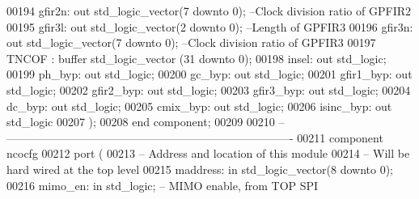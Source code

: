 \begin{DoxyCode}
00194         gfir2n: \textcolor{keywordflow}{out} \textcolor{comment}{std\_logic\_vector}(\textcolor{vhdllogic}{}\textcolor{vhdllogic}{7} \textcolor{keywordflow}{downto} \textcolor{vhdllogic}{}\textcolor{vhdllogic}{0});       \textcolor{keyword}{--Clock division ratio of GPFIR2}
00195         gfir3l: \textcolor{keywordflow}{out} \textcolor{comment}{std\_logic\_vector}(\textcolor{vhdllogic}{}\textcolor{vhdllogic}{2} \textcolor{keywordflow}{downto} \textcolor{vhdllogic}{}\textcolor{vhdllogic}{0});       \textcolor{keyword}{--Length of GPFIR3}
00196         gfir3n: \textcolor{keywordflow}{out} \textcolor{comment}{std\_logic\_vector}(\textcolor{vhdllogic}{}\textcolor{vhdllogic}{7} \textcolor{keywordflow}{downto} \textcolor{vhdllogic}{}\textcolor{vhdllogic}{0});       \textcolor{keyword}{--Clock division ratio of GPFIR3}
00197         TNCOF   : \textcolor{keywordflow}{buffer} \textcolor{comment}{std\_logic\_vector} (\textcolor{vhdllogic}{}\textcolor{vhdllogic}{31} \textcolor{keywordflow}{downto} \textcolor{vhdllogic}{}\textcolor{vhdllogic}{0});
00198         insel: \textcolor{keywordflow}{out} \textcolor{comment}{std\_logic};
00199         ph\_byp: \textcolor{keywordflow}{out} \textcolor{comment}{std\_logic};
00200         gc\_byp: \textcolor{keywordflow}{out} \textcolor{comment}{std\_logic};
00201         gfir1\_byp: \textcolor{keywordflow}{out} \textcolor{comment}{std\_logic};
00202         gfir2\_byp: \textcolor{keywordflow}{out} \textcolor{comment}{std\_logic};
00203         gfir3\_byp: \textcolor{keywordflow}{out} \textcolor{comment}{std\_logic};
00204         dc\_byp: \textcolor{keywordflow}{out} \textcolor{comment}{std\_logic};
00205         cmix\_byp: \textcolor{keywordflow}{out} \textcolor{comment}{std\_logic};
00206         isinc\_byp: \textcolor{keywordflow}{out} \textcolor{comment}{std\_logic}
00207     );
00208 \textcolor{keywordflow}{end} \textcolor{keywordflow}{component};
00209 
00210 \textcolor{keyword}{-- ----------------------------------------------------------------------------}
00211 \textcolor{keywordflow}{component} ncocfg
00212     \textcolor{keywordflow}{port} (
00213 \textcolor{keyword}{        -- Address and location of this module}
00214 \textcolor{keyword}{        -- Will be hard wired at the top level}
00215         maddress: \textcolor{keywordflow}{in} \textcolor{comment}{std\_logic\_vector}(\textcolor{vhdllogic}{}\textcolor{vhdllogic}{8} \textcolor{keywordflow}{downto} \textcolor{vhdllogic}{}\textcolor{vhdllogic}{0});
00216         mimo\_en: \textcolor{keywordflow}{in} \textcolor{comment}{std\_logic};  \textcolor{keyword}{-- MIMO enable, from TOP SPI}

\end{DoxyCode}
